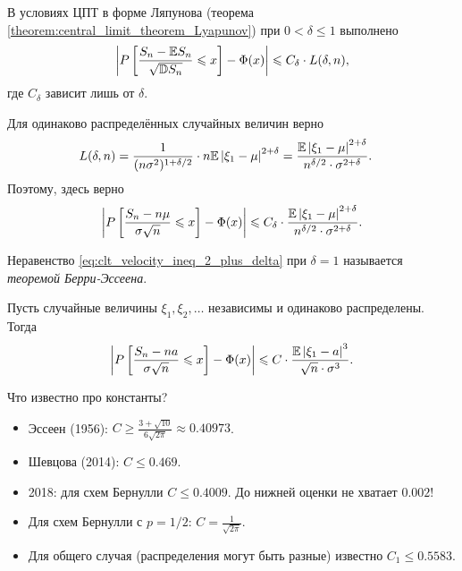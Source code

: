 \documentclass[../main.tex]{subfiles}
\begin{document}
\begin{thm}
 В условиях ЦПТ в форме Ляпунова (теорема \ref{theorem:central_limit_theorem_Lyapunov}) при $ 0 < \delta \leqslant 1 $ выполнено
 \begin{align*}
  \left| P \left[ \frac{S_n-\mathbb E S_n}{\sqrt{\mathbb D S_n}} \leqslant x\right] - \Phi(x) \right| \leqslant C_\delta \cdot L(\delta, n),
 \end{align*} где $ C_\delta $ зависит лишь от $ \delta $.
\end{thm}
\begin{remrk}
 Для одинаково распределённых случайных величин верно
 \begin{align*}
  L(\delta,n) &= \frac{1}{(n\sigma^{2})^{1 + \delta / 2}} \cdot n \mathbb E \left| \xi_1 - \mu \right|^{2 + \delta} = \frac{\mathbb E \left| \xi_1 - \mu \right|^{2 + \delta}}{n^{\delta / 2} \cdot \sigma^{2 + \delta}}.
 \end{align*} Поэтому, здесь верно
 \begin{align}
  \label{eq:clt_velocity_ineq_2_plus_delta}
  \left| P \left[ \frac{S_n- n\mu}{\sigma \sqrt{n}} \leqslant x \right] - \Phi(x) \right| \leqslant C_\delta \cdot \frac{\mathbb E \left| \xi_1 - \mu \right|^{2 + \delta}}{n^{\delta / 2} \cdot \sigma^{2 + \delta}}.
 \end{align}
\end{remrk}

Неравенство \eqref{eq:clt_velocity_ineq_2_plus_delta} при $ \delta = 1 $ называется \textit{теоремой Берри-Эссеена}.

\begin{thm}
 Пусть случайные величины $ \xi_1, \xi_2, \ldots $ независимы и одинаково распределены.  Тогда
 \begin{align*}
  \left| P \left[ \frac{S_n - na}{\sigma \sqrt n} \leqslant x \right] - \Phi(x) \right| \leqslant C \cdot \frac{\mathbb E \left| \xi_1 - a \right|^{3}}{\sqrt n \cdot \sigma^{3}}.
 \end{align*}
\end{thm}

Что известно про константы?

\begin{itemize}
 \item Эссеен (1956): $ C \geqslant \frac{3 + \sqrt{10}}{6 \sqrt{2\pi}} \approx 0.40973 $.
 \item Шевцова (2014): $ C \leqslant 0.469 $.
 \item 2018: для схем Бернулли $ C \leqslant 0.4009 $. До нижней оценки не хватает $ 0.002 $!
 \item Для схем Бернулли с $ p = 1/2 $: $ C = \frac{1}{\sqrt{2\pi}} $.

 \item Для общего случая (распределения могут быть разные)  известно $ C_1 \leqslant 0.5583 $.
\end{itemize}
\end{document}
